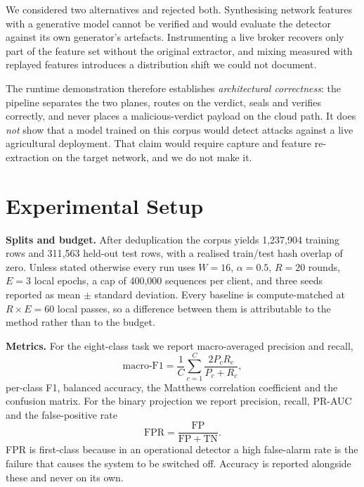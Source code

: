 \documentclass[conference]{IEEEtran}
\begin{document}
We considered two alternatives and rejected both. Synthesising network features with a generative
model cannot be verified and would evaluate the detector against its own generator's artefacts.
Instrumenting a live broker recovers only part of the feature set without the original extractor,
and mixing measured with replayed features introduces a distribution shift we could not document.

The runtime demonstration therefore establishes \emph{architectural correctness}: the pipeline
separates the two planes, routes on the verdict, seals and verifies correctly, and never places a
malicious-verdict payload on the cloud path. It does \emph{not} show that a model trained on this
corpus would detect attacks against a live agricultural deployment. That claim would require
capture and feature re-extraction on the target network, and we do not make it.

\section{Experimental Setup}\label{sec:setup}
\textbf{Splits and budget.} After deduplication the corpus yields 1{,}237{,}904 training rows
and 311{,}563 held-out test rows, with a realised train/test hash overlap of zero. Unless stated
otherwise every run uses $W = 16$, $\alpha = 0.5$, $R = 20$ rounds, $E = 3$ local epochs, a cap of
400{,}000 sequences per client, and three seeds reported as mean $\pm$ standard deviation. Every
baseline is compute-matched at $R \times E = 60$ local passes, so a difference between them is
attributable to the method rather than to the budget.

\textbf{Metrics.} For the eight-class task we report macro-averaged precision and recall,
\begin{equation}
\text{macro-F1} = \frac{1}{C}\sum_{c=1}^{C} \frac{2 P_c R_c}{P_c + R_c},
\label{eq:macrof1}
\end{equation}
per-class F1, balanced accuracy, the Matthews correlation coefficient and the confusion matrix.
For the binary projection we report precision, recall, PR-AUC and the false-positive rate
\begin{equation}
\mathrm{FPR} = \frac{\mathrm{FP}}{\mathrm{FP} + \mathrm{TN}}.
\label{eq:fpr}
\end{equation}
FPR is first-class because in an operational detector a high false-alarm rate is the failure that
causes the system to be switched off. Accuracy is reported alongside these and never on its own.
\end{document}
